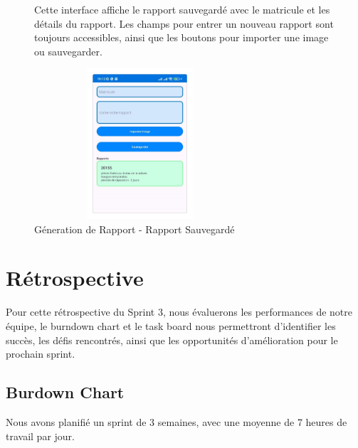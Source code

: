\begin{figure}[H]
    \centering
    \begin{minipage}{0.58\textwidth}
        \raggedright
        Cette interface affiche le rapport sauvegardé avec le matricule et les détails du rapport. Les champs pour entrer un nouveau rapport sont toujours accessibles, ainsi que les boutons pour importer une image ou sauvegarder.
    \end{minipage}
    \hfill
    \begin{minipage}{0.39\textwidth}
        \centering
        \includegraphics[width=0.7\textwidth,height=5.6cm]{chap5.images/r3.png}
        \caption{\centering Géneration de Rapport - Rapport Sauvegardé }
    \end{minipage}
\end{figure}

\newpage
\section{Rétrospective}
Pour cette rétrospective du Sprint 3, nous évaluerons les performances de notre équipe, le burndown chart et le task board nous permettront d'identifier les succès, les défis rencontrés, ainsi que les opportunités d'amélioration pour le prochain sprint.
\subsection{Burdown Chart}
Nous avons planifié un sprint de 3 semaines, avec une moyenne de 7 heures de travail par jour.

